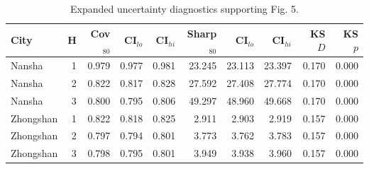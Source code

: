 \begin{table}[t]\centering\small
\begin{tabular}{l r r r r r r r r r}\toprule
City & H & Cov$_{80}$ & CI$_{lo}$ & CI$_{hi}$ & Sharp$_{80}$ & CI$_{lo}$ & CI$_{hi}$ & KS $D$ & KS $p$ \\
\midrule
Nansha & 1 & 0.979 & 0.977 & 0.981 & 23.245 & 23.113 & 23.397 & 0.170 & 0.000 \\
Nansha & 2 & 0.822 & 0.817 & 0.828 & 27.592 & 27.408 & 27.774 & 0.170 & 0.000 \\
Nansha & 3 & 0.800 & 0.795 & 0.806 & 49.297 & 48.960 & 49.668 & 0.170 & 0.000 \\
Zhongshan & 1 & 0.822 & 0.818 & 0.825 & 2.911 & 2.903 & 2.919 & 0.157 & 0.000 \\
Zhongshan & 2 & 0.797 & 0.794 & 0.801 & 3.773 & 3.762 & 3.783 & 0.157 & 0.000 \\
Zhongshan & 3 & 0.798 & 0.795 & 0.801 & 3.949 & 3.938 & 3.960 & 0.157 & 0.000 \\
\bottomrule\end{tabular}
\caption{Expanded uncertainty diagnostics supporting Fig. 5.}
\label{tab:s5_uncertainty}\end{table}
